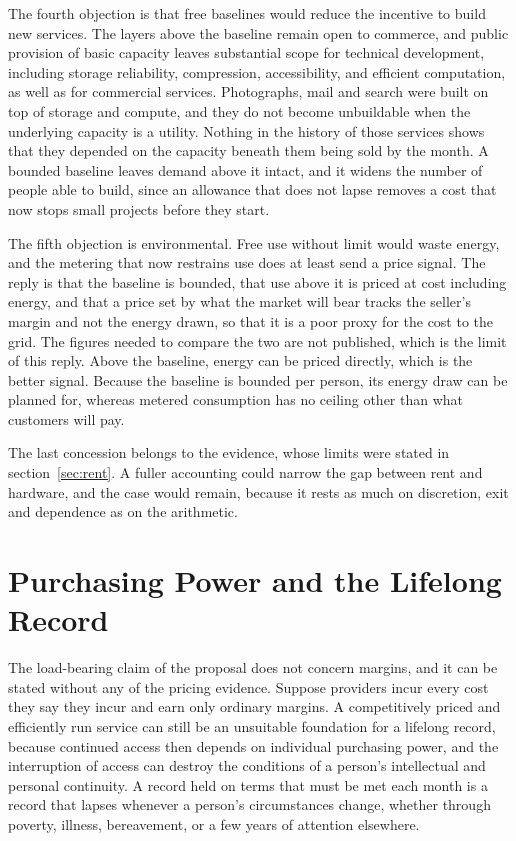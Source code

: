 \documentclass[12pt]{article}
\begin{document}
The fourth objection is that free baselines would reduce the incentive to build new services. The layers above the baseline remain open to commerce, and public provision of basic capacity leaves substantial scope for technical development, including storage reliability, compression, accessibility, and efficient computation, as well as for commercial services. Photographs, mail and search were built on top of storage and compute, and they do not become unbuildable when the underlying capacity is a utility. Nothing in the history of those services shows that they depended on the capacity beneath them being sold by the month. A bounded baseline leaves demand above it intact, and it widens the number of people able to build, since an allowance that does not lapse removes a cost that now stops small projects before they start.

The fifth objection is environmental. Free use without limit would waste energy, and the metering that now restrains use does at least send a price signal. The reply is that the baseline is bounded, that use above it is priced at cost including energy, and that a price set by what the market will bear tracks the seller's margin and not the energy drawn, so that it is a poor proxy for the cost to the grid. The figures needed to compare the two are not published, which is the limit of this reply. Above the baseline, energy can be priced directly, which is the better signal. Because the baseline is bounded per person, its energy draw can be planned for, whereas metered consumption has no ceiling other than what customers will pay.

The last concession belongs to the evidence, whose limits were stated in section~\ref{sec:rent}. A fuller accounting could narrow the gap between rent and hardware, and the case would remain, because it rests as much on discretion, exit and dependence as on the arithmetic.


\section{Purchasing Power and the Lifelong Record}

The load-bearing claim of the proposal does not concern margins, and it can be stated without any of the pricing evidence. Suppose providers incur every cost they say they incur and earn only ordinary margins. A competitively priced and efficiently run service can still be an unsuitable foundation for a lifelong record, because continued access then depends on individual purchasing power, and the interruption of access can destroy the conditions of a person's intellectual and personal continuity. A record held on terms that must be met each month is a record that lapses whenever a person's circumstances change, whether through poverty, illness, bereavement, or a few years of attention elsewhere.
\end{document}
